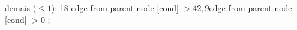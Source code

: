{{{%
demais ($\leq 1$): 18} edge from parent node [cond] {$>42,9$}}edge from parent node [cond] {$>0$}}
;